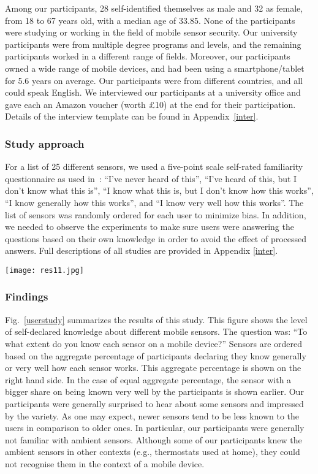 \documentclass[10pt,twocolumn]{article}
\begin{document}
Among our participants, 28 self-identified themselves as male and 32 as female, from 18 to 67 years old, with a median age of 33.85. 
None of the participants were studying or working in the field of mobile sensor security. Our university participants were from multiple degree programs and levels, and the remaining participants worked in a different range of fields. 
Moreover, our participants owned a wide range of mobile devices, and had been using a smartphone/tablet for 5.6 years on average. 
Our participants were from different countries, and all could speak English. 
We interviewed our participants at a university office and gave each an Amazon voucher (worth \pounds 10) at the end for their participation. 
Details of the interview template can be found in Appendix~\ref{inter}.  

\subsubsection{Study approach}
For a list of 25 different sensors, we used a five-point scale self-rated familiarity questionnaire as used in~\cite{self}: ``I've never heard of this'', ``I've heard of this, but I don't know what this is'', ``I know what this is, but I don't know how this works'', ``I know generally how this works'', and ``I know very well how this works''. 
The list of sensors was randomly ordered for each user to minimize bias. 
In addition, we needed to observe the experiments to make sure users were answering the questions based on their own knowledge in order to avoid the effect of processed answers. Full descriptions of all studies are provided in Appendix \ref{inter}. 

\begin{figure*}[!t]
	\centering
	\texttt{[image: res11.jpg]}
	\caption{ Level of self-declared knowledge about different mobile sensors.}
	\label{userstudy}
\end{figure*}
\subsubsection{Findings}
Fig.~\ref{userstudy} summarizes the results of this study. 
This figure shows the level of self-declared knowledge about different mobile sensors. The question was: ``To what extent do you know each sensor on a mobile device?'' Sensors are ordered based on the aggregate percentage of participants declaring they know generally or very well how each sensor works. This aggregate percentage is shown on the right hand side. In the case of equal aggregate percentage, the sensor with a bigger share on being known very well by the participants is shown earlier.   
Our participants were generally surprised to hear about some sensors and impressed by the variety. 
As one may expect, newer sensors tend to be less known to the users in comparison to older ones. 
In particular, our participants were generally not familiar with ambient sensors. Although some of our participants knew  the ambient sensors in other contexts (e.g., thermostats used at home), they could not recognise them in the context of a mobile device. 
\end{document}
